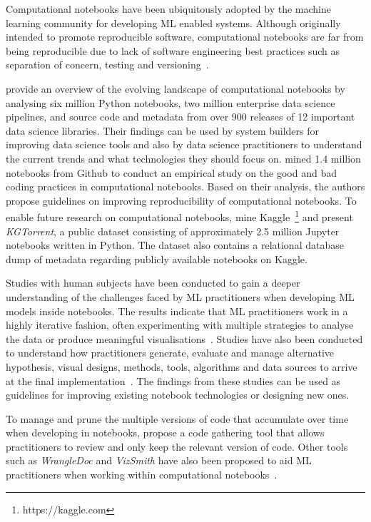 \documentclass[conference]{IEEEtran}
\begin{document}
Computational notebooks have been ubiquitously adopted by the machine
learning community for developing ML enabled systems. Although
originally intended to promote reproducible software, computational
notebooks are far from being reproducible due to lack of software
engineering best practices such as separation of concern, testing and
versioning~\cite{pimentel2019large}.

\cite{psallidas2019data} provide an overview of the evolving landscape
of computational notebooks by analysing six million Python notebooks,
two million enterprise data science pipelines, and source code and
metadata from over 900 releases of 12 important data science
libraries. Their findings can be used by system builders for improving
data science tools and also by data science practitioners to
understand the current trends and what technologies they should focus
on. \cite{pimentel2019large} mined 1.4 million notebooks from Github
to conduct an empirical study on the good and bad coding practices in
computational notebooks. Based on their analysis, the authors propose
guidelines on improving reproducibility of computational notebooks. To
enable future research on computational notebooks,
\cite{quaranta2021kgtorrent} mine Kaggle~\footnote{https://kaggle.com}
and present \textit{KGTorrent}, a public dataset consisting of
approximately 2.5 million Jupyter notebooks written in Python. The
dataset also contains a relational database dump of metadata regarding
publicly available notebooks on Kaggle.

Studies with human subjects have been conducted to gain a deeper
understanding of the challenges faced by ML practitioners when
developing ML models inside notebooks. The results indicate that ML
practitioners work in a highly iterative fashion, often experimenting
with multiple strategies to analyse the data or produce meaningful
visualisations~\cite{kandel2012enterprise, kery2018story,
liu2019understanding, chattopadhyay2020wrong}. Studies have also been
conducted to understand how practitioners generate, evaluate and
manage alternative hypothesis, visual designs, methods, tools,
algorithms and data sources to arrive at the final
implementation~\cite{liu2019understanding,kandel2012enterprise}. The
findings from these studies can be used as guidelines for improving
existing notebook technologies or designing new ones.

To manage and prune the multiple versions of code that accumulate over
time when developing in notebooks, \cite{head2019managing} propose
a code gathering tool that allows practitioners to review and only
keep the relevant version of code. Other tools such as
\textit{WrangleDoc} and \textit{VizSmith} have also been proposed to
aid ML practitioners when working within computational
notebooks~\cite{yang2021subtle, bavishi2021vizsmith}.
\end{document}
